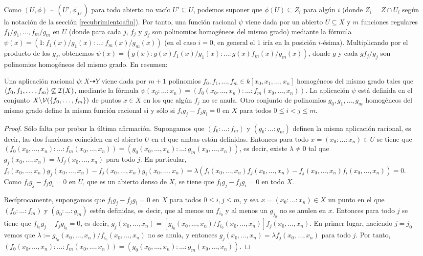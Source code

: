 \documentclass[ACGA.tex]{subfiles}
\begin{document}
Como $(U,\phi)\sim (U',\phi_{|U'})$ para todo abierto no vacío $U'\subseteq U$, podemos suponer que $\phi(U)\subseteq Z_i$ para algún $i$ (donde $Z_i=Z\cap U_i$ según la notación de la sección \ref{recubrimientoafin}). Por tanto, una función racional $\psi$ viene dada por un abierto $U\subseteq X$ y $m$ funciones regulares $f_1/g_1,\ldots,f_m/g_m$ en $U$ (donde para cada $j$, $f_j$ y $g_j$ son polinomios homogéneos del mismo grado) mediante la fórmula $\psi(x)=(1:f_1(x)/g_1(x):\ldots:f_m(x)/g_m(x))$ (en el caso $i=0$, en general el $1$ iría en la posición $i$-ésima). Multiplicando por el producto de los $g_j$, obtenemos $\psi(x)=(g(x):g(x)f_1(x)/g_1(x):\ldots:g(x)f_m(x)/g_m(x))$, donde $g$ y cada $gf_j/g_j$ son polinomios homogéneos del mismo grado. En resumen:

\begin{prop}
 Una aplicación racional $\psi:X\dashrightarrow Y$ viene dada por $m+1$ polinomios $f_0,f_1,\ldots,f_m\in k[x_0,x_1,\ldots,x_n]$ homogéneos del mismo grado tales que $\langle f_0,f_1,\ldots,f_m\rangle\not\subseteq\mathcal{I}(X)$, mediante la fórmula $\psi(x_0:\ldots:x_n)=(f_0(x_0,\ldots,x_n):\ldots:f_m(x_0,\ldots,x_n))$. La aplicación $\psi$ está definida en el conjunto $X\backslash\mathcal{V}(\{f_0,\ldots,f_m\})$ de puntos $x\in X$ en los que algún $f_j$ no se anula. Otro conjunto de polinomios $g_0,g_1,\ldots,g_m$ homogéneos del mismo grado define la misma función racional si y sólo si $f_ig_j-f_jg_i=0$ en $X$ para todos $0\leq i<j\leq m$. 
\end{prop}

\begin{proof}
 Sólo falta por probar la última afirmación. Supongamos que $(f_0:\ldots:f_m)$ y $(g_0:\ldots:g_m)$ definen la misma aplicación racional, es decir, las dos funciones coinciden en el abierto $U$ en el que ambas están definidas. Entonces para todo $x=(x_0:\ldots:x_n)\in U$ se tiene que $(f_0(x_0,\ldots,x_n):\ldots:f_m(x_0,\ldots,x_n))=(g_0(x_0,\ldots,x_n):\ldots:g_m(x_0,\ldots,x_n))$, es decir, existe $\lambda\neq 0$ tal que $g_j(x_0,\ldots,x_n)=\lambda f_j(x_0,\ldots,x_n)$ para todo $j$. En particular, $f_i(x_0,\ldots,x_n)g_j(x_0,\ldots,x_n)-f_j(x_0,\ldots,x_n)g_i(x_0,\ldots,x_n)=\lambda(f_i(x_0,\ldots,x_n)f_j(x_0,\ldots,x_n)-f_j(x_0,\ldots,x_n)f_i(x_0,\ldots,x_n))=0$. Como $f_ig_j-f_jg_i=0$ en $U$, que es un abierto denso de $X$, se tiene que $f_ig_j-f_jg_i=0$ en todo $X$.
 
Recíprocamente, supongamos que $f_ig_j-f_jg_i=0$ en $X$ para todos $0\leq i,j\leq m$, y sea $x=(x_0:\ldots:x_n)\in X$ un punto en el que $(f_0:\ldots:f_m)$ y $(g_0:\ldots:g_m)$ estén definidas, es decir, que al menos un $f_{i_0}$ y al menos un $g_{j_0}$ no se anulen en $x$. Entonces para todo $j$ se tiene que $f_{i_0}g_j-f_jg_{i_0}=0$, es decir, $g_j(x_0,\ldots,x_n)=[g_{i_0}(x_0,\ldots,x_n)/f_{i_0}(x_0,\ldots,x_n)]f_j(x_0,\ldots,x_n)$. En primer lugar, haciendo $j=j_0$ vemos que $\lambda:=g_{i_0}(x_0,\ldots,x_n)/f_{i_0}(x_0,\ldots,x_n)$ no se anula, y entonces $g_j(x_0,\ldots,x_n)=\lambda f_j(x_0,\ldots,x_n)$ para todo $j$. Por tanto, $(f_0(x_0,\ldots,x_n):\ldots:f_m(x_0,\ldots,x_n))=(g_0(x_0,\ldots,x_n):\ldots:g_m(x_0,\ldots,x_n))$.
\end{proof}
\end{document}
